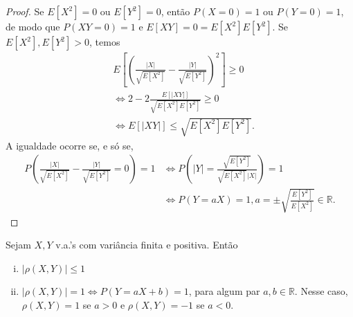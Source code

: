 \documentclass[../Notas.tex]{subfiles}
\begin{document}
\begin{proof}
Se $E[X^2] = 0$ ou $E[Y^2] = 0$, então $P(X=0) = 1$ ou $P(Y=0) = 1$, de modo que $P(XY=0) = 1$ e $E[XY] = 0 = E[X^2]E[Y^2]$. Se $E[X^2], E[Y^2] > 0$, temos
\begin{align*}
    &E\left[ \left( \frac{|X|}{\sqrt{E[X^2]}} - \frac{|Y|}{\sqrt{E[Y^2]}} \right)^2 \right] \geq 0 \\
    &\iff 2 - 2\frac{E[|XY|]}{\sqrt{E[X^2]E[Y^2]}} \geq 0 \\
    &\iff E[|XY|] \leq \sqrt{E[X^2]E[Y^2]}.
\end{align*}
A igualdade ocorre se, e só se, 
\begin{align*}
    P\left( \frac{|X|}{\sqrt{E[X^2]}} - \frac{|Y|}{\sqrt{E[Y^2]}} = 0 \right) = 1 &\iff P\left( |Y| = \frac{ \sqrt{E[Y^2]} }{ \sqrt{E[X^2]}|X| } \right) = 1 \\
    &\iff P(Y = aX) = 1, a = \pm\sqrt{\frac{ E[Y^2] }{ E[X^2] }} \in\mathbb{R}.
\end{align*}
\end{proof}

\begin{proposition}
Sejam $X, Y$ v.a.'s com variância finita e positiva. Então
\begin{enumerate}[(i)]
    \item $|\rho(X,Y)| \leq 1$
    \item $|\rho(X,Y)| = 1 \iff P(Y = aX + b) = 1$, para algum par $a,b\in\mathbb{R}$. Nesse caso, $\rho(X,Y) = 1$ se $a>0$ e $\rho(X,Y) = -1$ se $a<0$.
\end{enumerate}
\end{proposition}
\end{document}
